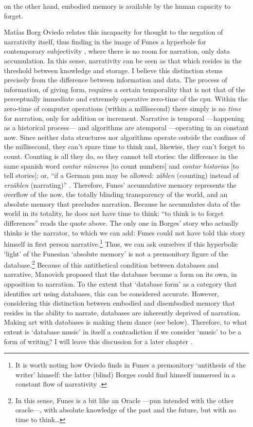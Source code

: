 on the other hand, embodied memory is available by the human capacity to forget.

Matías Borg Oviedo \parencite{Ovi19:Mem} relates this incapacity for thought to the negation of narrativity itself, thus finding in the image of Funes a hyperbole for contemporary subjectivity \parencite[5]{Ovi19:Mem}, where there is no room for narration, only data accumulation. In this sense, narrativity can be seen as that which resides in the threshold between knowledge and storage. I believe this distinction stems precisely from the difference between information and data. The process of information, of giving form, requires a certain temporality that is not that of the perceptually immediate and extremely operative zero-time of the \gls{cpu}. Within the zero-time of computer operations (within a millisecond) there simply is no \textit{time} for narration, only for addition or increment. Narrative is temporal ---happening as a historical process--- and algorithms are atemporal ---operating in an constant now. Since neither data structures nor algorithms operate outside the confines of the millisecond, they can't spare time to think and, likewise, they can't forget to count. Counting is all they do, so they cannot tell stories: the difference in the same spanish word \textit{contar números} [to count numbers] and \textit{contar historias} [to tell stories]; or, ``if a German pun may be allowed: \textit{zählen} (counting) instead of \textit{erzählen} (narrating)'' \textcite[128]{Ern13:Dig}. Therefore, Funes' accumulative memory represents the overflow of the now, the totally blinding transparency of the world, and an absolute memory that precludes narration. Because he accumulates data of the world in its totality, he does not have time to think: ``to think is to forget differences'' reads the quote above. The only one in Borges' story who actually thinks is the narrator, to which we can add: Funes could not have told this story himself in first person narrative.\footnote{It is worth noting how Oviedo finds in Funes a premonitory `antithesis of the writer' himself: the latter (blind) Borges could find himself immersed in a constant flow of narrativity \parencite{Ovi19:Mem}.} Thus, we can ask ourselves if this hyperbolic `light' of the Funesian `absolute memory' is not a premonitory figure of the database.\footnote{In this sense, Funes is a bit like an Oracle ---pun intended with the other \gls{oracle}---, with absolute knowledge of the past and the future, but with no time to think\dots} Because of this antithetical condition between databases and narrative, Manovich proposed that the database became a form on its own, in opposition to narration. To the extent that `database form' as a category that identifies art using databases, this can be considered accurate. However, considering this distinction between embodied and disembodied memory that resides in the ability to narrate, databases are inherently deprived of narration. Making art with databases is making them dance (see below). Therefore, to what extent is `database music' in itself a contradiction if we consider `music' to be a form of writing? I will leave this discussion for a later chapter .

